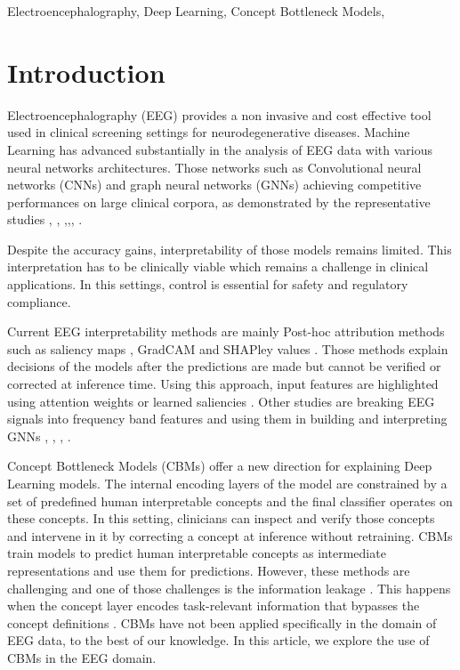 \documentclass[journal,twoside,web]{ieeecolor}
\begin{document}
\begin{IEEEkeywords}
Electroencephalography, Deep Learning, Concept Bottleneck Models,
\end{IEEEkeywords}

\section{Introduction}
\label{sec:introduction}

Electroencephalography (EEG) provides a non invasive and cost effective tool used in clinical screening settings for neurodegenerative diseases. Machine Learning has advanced substantially in the analysis of EEG data with various neural networks architectures. Those networks such as Convolutional neural networks (CNNs) and graph neural networks (GNNs) achieving competitive performances on large clinical corpora, as demonstrated by the representative studies
\cite{schirrmeister2017}, \cite{lawhern2016eegnet}, \cite{demir2021eeg},\cite{song2018eeg},\cite{klepl2024}, \cite{roy2019chrononet}.

Despite the accuracy gains, interpretability of those models remains limited. This interpretation has to be clinically viable which remains a challenge in clinical applications. In this settings, control is essential for safety and regulatory compliance.

Current EEG interpretability methods are mainly Post-hoc attribution methods such as saliency maps \cite{simonyan2013}, GradCAM \cite{selvaraju2017} and SHAPley values \cite{lundberg2017}. Those methods explain decisions of the models after the predictions are made but cannot be verified or corrected at inference time. Using this approach, input features are highlighted using attention weights or learned saliencies \cite{demir2022, zhao2024}. Other studies are breaking EEG signals into frequency band features and using them in building and interpreting GNNs \cite{tawhid2024exploring}, \cite{radwan2025frequency}, \cite{klepl2024graph}, \cite{abadal2025graph}.

Concept Bottleneck Models (CBMs) \cite{koh2020} offer a new direction for explaining Deep Learning models. The internal encoding layers of the model are constrained by a set of predefined human interpretable concepts and the final classifier operates on these concepts. In this setting, clinicians can inspect and verify those concepts and intervene in it by correcting a concept at inference without retraining. CBMs train models to predict human interpretable concepts as intermediate representations and use them for predictions. However, these methods are challenging and one of those challenges is the information leakage \cite{havasi2022}. This happens when the concept layer encodes task-relevant information that bypasses the concept definitions \cite{mahinpei2021}. CBMs have not been applied specifically in the domain of EEG data, to the best of our knowledge. In this article, we explore the use of CBMs in the EEG domain. 
\end{document}

